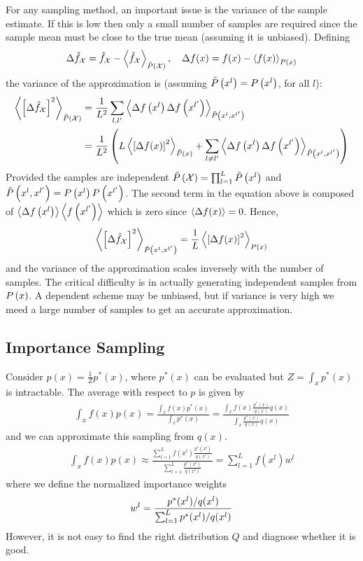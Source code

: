 For any sampling method, an important issue is the variance of the sample estimate. If this is low then only a small number of samples are required since the sample mean must be close to the true mean (assuming it is unbiased). Defining
\begin{align*}
\De\hat{f}_\cX=\hat{f}_\cX-\vecx{\hat{f}_\cX}_{\ti{P}\left(\cX\right)},\quad \De f(x)=f(x)-\vecx{f(x)}_{\P{x}}
\end{align*}
the variance of the approximation is (assuming $\ti{P}\left(x^l\right)=\P{x^l}$, for all $l$):
\begin{align*}
\vecx{\left[\De\hat{f}_\cX\right]^2}_{\ti{P}\left(\cX\right)}&=\frac{1}{L^2}\sum_{l,l'}\vecx{\De f\left(x^l\right)\De f\left(x^{l'}\right)}_{\ti{P}\left(x^l,x^{l'}\right)} \\
&=\frac{1}{L^2}\left(L\vecx{\left[\De f(x)\right]^2}_{\ti{P}\left(x\right)}+\sum_{l\neq l'}\vecx{\De f\left(x^l\right)\De f\left(x^{l'}\right)}_{\ti{P}\left(x^l,x^{l'}\right)}\right)
\end{align*}
Provided the samples are independent $\ti{P}\left(\cX\right)=\prod_{l=1}^L\ti{P}\left(x^l\right)$ and $\ti{P}\left(x^l,x^{l'}\right)=\P{x^l}\P{x^{l'}}$. The second term in the equation above is composed of $\vecx{\De f\left(x^l\right)}\vecx{f\left(x^{l'}\right)}$ which is zero since $\vecx{\De f(x)}=0$. Hence,
\begin{align*}
\vecx{\left[\De\hat{f}_\cX\right]^2}_{\ti{P}\left(x^l,x^{l'}\right)}=\frac{1}{L}\vecx{\left[\De f(x)\right]^2}_{\P{x}}
\end{align*}
and the variance of the approximation scales inversely with the number of samples. The critical difficulty is in actually generating independent samples from $\P{x}$. A dependent scheme may be unbiased, but if variance is very high we meed a large number of samples to get an accurate approximation.

\subsection{Importance Sampling}

Consider $p(x)=\frac{1}{Z}p^*(x)$, where $p^*(x)$ can be evaluated but $Z=\int_xp^*(x)$ is intractable. The average with respect to $p$ is given by
\begin{align*}
\int_xf(x)p(x)=\frac{\int_xf(x)p^*(x)}{\int_xp^*(x)}=\frac{\int_xf(x)\frac{p^*(x)}{q(x)}q(x)}{\int_x\frac{p^*(x)}{q(x)}q(x)}
\end{align*}
and we can approximate this sampling from $q(x)$.
\begin{align*}
\int_xf(x)p(x)\approx\frac{\sum_{l=1}^Lf(x^l)\frac{p^*(x^l)}{q(x^l)}}{\sum_{l=1}^L\frac{p^*(x^l)}{q(x^l)}}=\sum_{l=1}^Lf(x^l)w^l
\end{align*}
where we define the normalized importance weights
\begin{align*}
w^l=\frac{\pfrac{p^*(x^l)}{q(x^l)}}{\pfrac{\sum_{l=1}^Lp^*(x^l)}{q(x^l)}}
\end{align*}
However, it is not easy to find the right distribution $Q$ and diagnose whether it is good.

